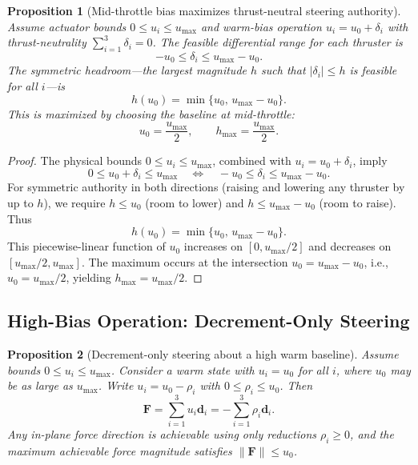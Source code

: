 \documentclass{article}
\newtheorem{proposition}{Proposition}
\begin{document}
\begin{proposition}[Mid-throttle bias maximizes thrust-neutral steering authority]
\label{prop:headroom_mid}
Assume actuator bounds $0 \le u_i \le u_{\max}$ and warm-bias operation $u_i = u_0 + \delta_i$ 
with thrust-neutrality $\sum_{i=1}^{3} \delta_i = 0$. The feasible differential range for each 
thruster is
\[
-u_0 \le \delta_i \le u_{\max} - u_0.
\]
The \emph{symmetric headroom}---the largest magnitude $h$ such that $|\delta_i| \le h$ is 
feasible for all $i$---is
\[
h(u_0) = \min\{u_0,\, u_{\max} - u_0\}.
\]
This is maximized by choosing the baseline at mid-throttle:
\begin{equation}
u_0 = \frac{u_{\max}}{2}, \qquad h_{\max} = \frac{u_{\max}}{2}.
\end{equation}
\end{proposition}

\begin{proof}
The physical bounds $0 \le u_i \le u_{\max}$, combined with $u_i = u_0 + \delta_i$, imply
\[
0 \le u_0 + \delta_i \le u_{\max}
\quad\Longleftrightarrow\quad
-u_0 \le \delta_i \le u_{\max} - u_0.
\]
For symmetric authority in both directions (raising and lowering any thruster by up to $h$), 
we require $h \le u_0$ (room to lower) and $h \le u_{\max} - u_0$ (room to raise). Thus
\[
h(u_0) = \min\{u_0,\, u_{\max} - u_0\}.
\]
This piecewise-linear function of $u_0$ increases on $[0, u_{\max}/2]$ and decreases on 
$[u_{\max}/2, u_{\max}]$. The maximum occurs at the intersection $u_0 = u_{\max} - u_0$, 
i.e., $u_0 = u_{\max}/2$, yielding $h_{\max} = u_{\max}/2$.
\end{proof}


\subsection{High-Bias Operation: Decrement-Only Steering}

\begin{proposition}[Decrement-only steering about a high warm baseline]
\label{prop:decrement_only}
Assume bounds $0 \le u_i \le u_{\max}$. Consider a warm state with $u_i=u_0$ for all $i$, where
$u_0$ may be as large as $u_{\max}$. Write $u_i=u_0-\rho_i$ with $0 \le \rho_i \le u_0$. Then
\begin{equation}
\mathbf F = \sum_{i=1}^3 u_i\mathbf d_i = -\sum_{i=1}^{3} \rho_i \mathbf d_i.
\end{equation}
Any in-plane force direction is achievable using only reductions $\rho_i\ge 0$, and the maximum
achievable force magnitude satisfies $\|\mathbf F\|\le u_0$.
\end{proposition}
\end{document}

